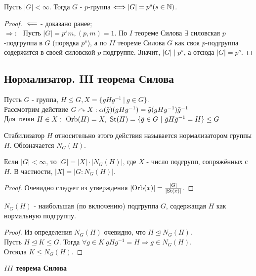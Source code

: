 \begin{consequense}
    Пусть $|G| < \infty$. Тогда $G$ - $p$-группа $\Longleftrightarrow |G| = p^s (s\in \mathbb{N})$. 
\end{consequense}
\begin{proof}
    $ \\ \Longleftarrow$ - доказано ранее;\\
    $\Longrightarrow: \ \ $ Пусть $|G| = p^sm, (p, m) = 1$. По $I$ теореме Силова $\exists$ силовская $p$-подгруппа в $G$ (порядка $p^s$), а по $II$ теореме Силова $G$ как своя $p$-подгруппа содержится в своей силовской $p$-подгруппе. Значит, $|G| \mid p^s$, а отсюда $|G| = p^s$.
\end{proof}
\subsection{Нормализатор. III теорема Силова}
Пусть $G$ - группа, $H \leq G, X = \{gHg^{-1} \ | \ g \in G\}$.\\
Рассмотрим действие $G \curvearrowright X: \alpha(\tilde{g})(gHg^{-1}) = \tilde{g}(gHg^{-1})\tilde{g}^{-1}$\\
Для точки $H \in X: \ \textup{Orb}(H) = X, \ \textup{St}(H) = \{\tilde{g} \in G \ | \ \tilde{g}H\tilde{g}^{-1} = H\} \leq G$
\begin{definition}
    Стабилизатор $H$ относительно этого действия называется нормализатором группы $H$. Обозначается $N_G(H)$. 
\end{definition}
\begin{subtheoremnum}
    Если $|G| < \infty$, то $|G| = |X| \cdot |N_G(H)|$, где $X$ - число подгрупп, сопряжённых с $H$. В частности, $|X| = |G : N_G(H)|$.
\end{subtheoremnum}
\begin{proof}
    Очевидно следует из утверждения $|\textup{Orb}(x)| = \frac{|G|}{|\textup{St}(x)|}$.
\end{proof}
\begin{subtheoremnum}
    $N_G(H)$ - наибольшая (по включению) подгруппа $G$, содержащая $H$ как нормальную подгруппу.
\end{subtheoremnum}
\begin{proof}
    Из определения $N_G(H)$ очевидно, что $H \unlhd N_G(H)$.\\
    Пусть $H \unlhd K \leq G$. Тогда $\forall g \in K\  gHg^{-1} = H \Longrightarrow g \in N_G(H)$.\\
    Отсюда $K \leq N_G(H)$.
\end{proof}
\textbf{$III$ теорема Силова}\\
